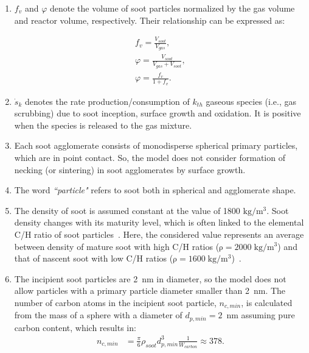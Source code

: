 \begin{enumerate}
	
	\item $f_v$ and $\varphi$ denote the volume of soot particles normalized by the gas volume and reactor volume, respectively. Their relationship can be expressed as:
	
	\begin{equation}
		\begin{split}
			f_v = \frac{V_{soot}}{V_{gas}}, \\
			\varphi = \frac{V_{soot}}{V_{gas} + V_{soot}}, \\
			\varphi = \frac{f_v}{1 + f_v}
			\label{eqn:fvdef}.
		\end{split}
	\end{equation}
	
	\item ${\dot{s}_k}$ denotes the rate production/consumption of $k_{th}$ gaseous species (i.e., gas scrubbing) due to soot inception, surface growth and oxidation. It is positive when the species is released to the gas mixture.
	
	\item Each soot agglomerate consists of monodisperse spherical primary particles, which are in point contact. So, the model does not consider formation of necking (or sintering) in soot agglomerates by surface growth.
	
	
	\item The word \textit{``particle"} refers to soot both in spherical and agglomerate shape. 
	
	\item The density of soot is assumed constant at the value of 1800 $\mathrm{kg/m^3}$. Soot density changes with its maturity level, which is often linked to the elemental C/H ratio of soot particles~\citep{michelsen2021effects}. Here, the considered value represents an average between density of mature soot with high C/H ratios ($\mathrm{\rho=2000\;kg/m^3}$) and that of nascent soot with low C/H ratios ($\mathrm{\rho=1600\;kg/m^3}$)~\citep{jensen2007measurement, michelsen2021effects}.
	
	\item The incipient soot particles are 2~nm in diameter, so the model does not allow particles with a primary particle diameter smaller than 2~nm. The number of carbon atoms in the incipient soot particle, $n_{c,min}$, is calculated from the mass of a sphere with a diameter of $d_{p,min}=2$~nm assuming pure carbon content, which results in:
	\begin{equation}
		\begin{split}
			n_{c,min}& =\frac{\pi}{6}\rho_{soot}d^3_{p,min}\frac{1}{W_{carbon}}\approx378.
			\label{eqn:nc_min}
		\end{split}
	\end{equation}
	

\end{enumerate}

